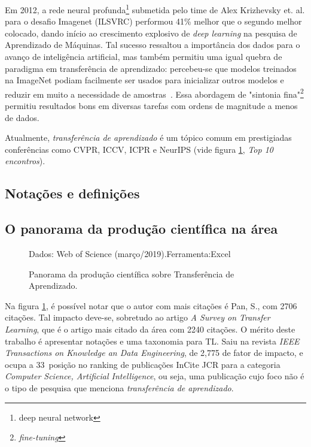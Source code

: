 \documentclass[sigconf]{acmart}
\newcommand{\source}[2]{\raggedleft{}\vspace*{-7mm}\caption*{ \textmd{\scriptsize{Dados: {#1}.\hfill Ferramenta:{#2}}}}}
\begin{document}
  Em 2012, a rede neural profunda\footnote{deep neural network} submetida pelo time de Alex Krizhevsky et. al. para o desafio Imagenet (ILSVRC) performou 41\% melhor que o segundo melhor colocado, dando início ao crescimento explosivo de \emph{deep learning} na pesquisa de Aprendizado de Máquinas. Tal sucesso ressaltou a importância dos dados para o avanço de inteligência artificial, mas também permitiu uma igual quebra de paradigma em transferência de aprendizado: percebeu-se que modelos treinados na ImageNet podiam facilmente ser usados para inicializar outros modelos e reduzir em muito a necessidade de amostras~\cite{Ruder2019Neural}.   Essa abordagem de "sintonia fina"\footnote{\emph{fine-tuning}} permitiu resultados bons em diversas tarefas com ordens de magnitude a menos de dados. 

  Atualmente, \emph{transferência de aprendizado} é um tópico comum em prestigiadas conferências como CVPR, ICCV, ICPR e NeurIPS (vide figura \ref{fig:toptop}, \emph{Top 10 encontros}).
  \subsection{Notações e definições}
  \subsection{O panorama da produção científica na área}\label{sec:panorama}
  \begin{figure}[t]
    \centering
    \source{Web of Science (março/2019)}{Excel}
    \caption{Panorama da produção científica sobre Transferência de Aprendizado.} \label{fig:toptop}
  \end{figure}
  Na figura \ref{fig:toptop}, é possível notar que o autor com mais citações é Pan, S., com 2706 citações. Tal impacto deve-se, sobretudo ao artigo \emph{A Survey on Transfer Learning}, que é o artigo mais citado da área com 2240 citações. O mérito deste trabalho é apresentar notações e uma taxonomia para TL. Saiu na revista \emph{IEEE Transactions on Knowledge an Data Engineering}, de 2,775 de fator de impacto, e ocupa a 33\textordfeminine ~posição no ranking de publicações InCite JCR para a categoria \emph{Computer Science, Artificial Intelligence}, ou seja, uma publicação cujo foco não é o tipo de pesquisa que menciona \emph{transferência de aprendizado}. 
\end{document}
